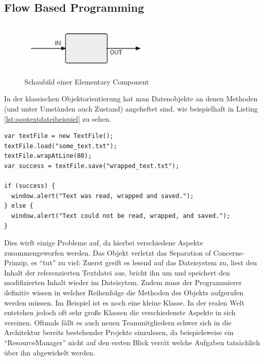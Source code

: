 \subsection{Flow Based Programming}
\begin{figure}
\centering
\includegraphics{bilder/fbp_component.png}
\caption{Schaubild einer Elementary Component \autocite{FlowBasedProgramming}}
\label{fig:fbpkomponente}
\end{figure}
In der klassischen Objektorientierung hat man Datenobjekte an denen Methoden (und unter Umständen auch Zustand) angeheftet sind, wie beispielhaft in Listing \ref{lst:ooptextdateibeispiel} zu sehen.
\lstset{language=JavaScript}
\begin{lstlisting}[caption={Beispiel für das objektorientierte Umbrechen einer Textdatei in JavaScript}, label={lst:ooptextdateibeispiel}]
var textFile = new TextFile();
textFile.load("some_text.txt");
textFile.wrapAtLine(80);
var success = textFile.save("wrapped_text.txt");

if (success) {
  window.alert("Text was read, wrapped and saved.");
} else {
  window.alert("Text could not be read, wrapped, and saved.");
}
\end{lstlisting}
Dies wirft einige Probleme auf, da hierbei verschiedene Aspekte zusammengeworfen werden. Das Objekt verletzt das Separation of Concerns-Prinzip, es "`tut"' zu viel: Zuerst greift es lesend auf das Dateisystem zu, liest den Inhalt der referenzierten Textdatei aus, bricht ihn um und speichert den modifizierten Inhalt wieder im Dateisytem. Zudem muss der Programmierer definitiv wissen in welcher Reihenfolge die Methoden des Objekts aufgerufen werden müssen. Im Beispiel ist es noch eine kleine Klasse. In der realen Welt entstehen jedoch oft sehr große Klassen die verschiedenste Aspekte in sich vereinen. Oftmals fällt es auch neuen Teammitgliedern schwer sich in die Architektur bereits bestehender Projekte einzulesen, da beispielsweise ein "`ResourceManager"' nicht auf den ersten Blick verrät welche Aufgaben tatsächlich über ihn abgewickelt werden.

